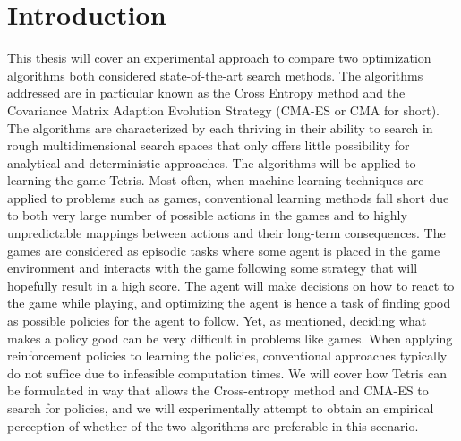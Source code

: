 \section{Introduction \label{sec:intro}}

This thesis will cover an experimental approach 
to compare two optimization algorithms both considered 
state-of-the-art search methods. The algorithms addressed
are in particular known as the Cross Entropy method and 
the Covariance Matrix Adaption Evolution Strategy (CMA-ES or CMA
for short). The algorithms are characterized by each thriving
in their ability to search in rough multidimensional 
search spaces that only offers little possibility 
for analytical and deterministic approaches.
The algorithms will be applied to 
learning the game Tetris. Most often, when machine learning
techniques are applied to problems such as games, conventional
learning methods fall short due to both  very large number of 
possible actions in the games and to highly unpredictable mappings 
between actions and their long-term consequences. The games 
are considered as episodic tasks where some agent is placed
in the game environment and interacts with the game following some
strategy that will hopefully result in a high score. 
The agent will make decisions on how to react 
to the game while playing, and optimizing the agent is hence a task of
finding good as possible policies for the agent to follow. Yet, as mentioned,
deciding what makes a policy good can be very difficult in
problems like games. When applying reinforcement policies to learning
the policies, conventional approaches typically do not suffice 
due to infeasible computation times. We will cover how
Tetris can be formulated in way that allows  the Cross-entropy method 
and CMA-ES to search for policies, and we will experimentally 
attempt to obtain an empirical perception of whether of the two algorithms
are preferable in this scenario.










